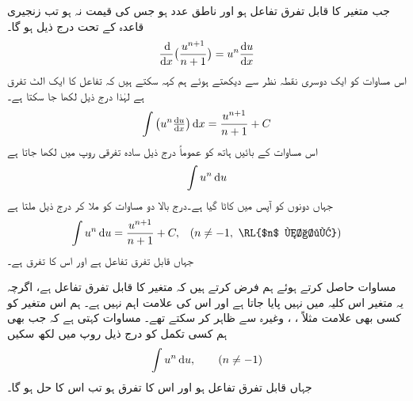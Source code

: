 جب   متغیر  کا قابل تفرق تفاعل ہو اور  ناطق عدد ہو جس کی قیمت  نہ ہو تب زنجیری قاعدہ کے تحت درج ذیل ہو گا۔
\begin{align*}
\frac{\dif}{\dif x}\big(\frac{u^{n+1}}{n+1}\big)=u^n\frac{\dif u}{\dif x}
\end{align*}
اس مساوات کو ایک دوسری نقطہ نظر سے دیکھتے ہوئے ہم کہہ سکتے ہیں کہ تفاعل  کا ایک الٹ تفرق  ہے لہٰذا درج ذیل لکھا جا سکتا ہے۔
\begin{align*}
\int \big(u^n\tfrac{\dif u}{\dif x}\big)\dif x=\frac{u^{n+1}}{n+1}+C
\end{align*}
اس مساوات کے بائیں ہاتھ کو عموماً درج ذیل سادہ تفرقی روپ میں لکھا جاتا ہے
\begin{align*}
\int u^n\dif u
\end{align*}
جہاں دونوں  کو آپس میں کاٹا گیا ہے۔درج بالا دو مساوات کو ملا کر درج ذیل ملتا ہے
\begin{align}\label{مساوات_تکمل_پہلا_کلیہ}
\int u^n\dif u=\frac{u^{n+1}}{n+1}+C,&&(n\ne -1, \,\, \text{\RL{$n$ ناطق}})
\end{align}
جہاں  قابل تفرق تفاعل ہے اور  اس کا تفرق ہے۔

مساوات  حاصل کرتے ہوئے ہم فرض کرتے ہیں کہ  متغیر  کا قابل تفرق تفاعل ہے، اگرچہ یہ متغیر اس کلیہ میں نہیں پایا جاتا ہے اور اس کی علامت اہم نہیں ہے۔ ہم اس متغیر کو کسی بھی علامت مثلاً ، ، وغیرہ سے ظاہر کر سکتے تھے۔ مساوات  کہتی ہے کہ جب بھی ہم کسی تکمل کو درج ذیل روپ میں لکھ سکیں
\begin{align*}
\int u^n\dif u,\quad \quad (n\ne -1)
\end{align*}
جہاں  قابل تفرق تفاعل ہو اور  اس کا تفرق ہو تب اس کا حل  ہو گا۔


